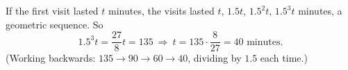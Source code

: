 If the first visit lasted $t$ minutes, the visits lasted $t$, $1.5t$, $1.5^2t$, $1.5^3t$ minutes, a geometric sequence. So
\[
1.5^3t=\dfrac{27}{8}t=135\ \Longrightarrow\ t=135\cdot\dfrac{8}{27}=\boxed{40\text{ minutes}}.
\]
(Working backwards: $135\to90\to60\to40$, dividing by $1.5$ each time.)
